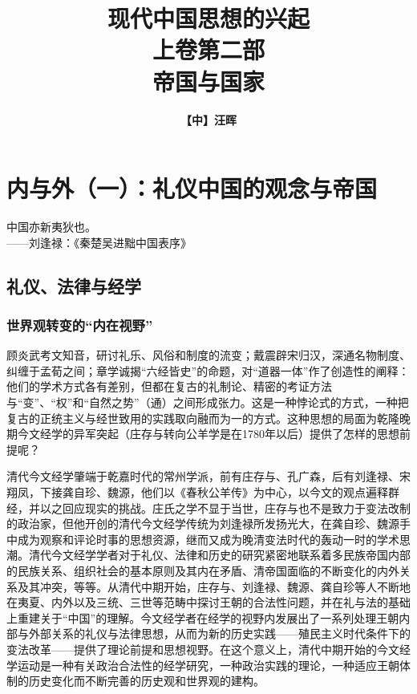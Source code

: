 \documentclass[a4paper, 12pt, openright]{ctexbook}
\renewenvironment{quote}
  {\list{}{\rightmargin2\ccwd \leftmargin2\ccwd \itemindent=2\ccwd \listparindent=2\ccwd}%
   \item\relax\small\kaishu\color{black}}
  {\endlist}
\begin{document}
\title{\Huge \textbf{现代中国思想的兴起}\\\Large 上卷\quad 第二部\\ \Large 帝国与国家}
\author{\textbf{【中】汪晖}}
\date{}

\frontmatter

\maketitle

\tableofcontents

\mainmatter

\setcounter{chapter}{4}

\chapter{内与外（一）：礼仪中国的观念与帝国}

\begin{quote}
中国亦新夷狄也。\\
\hspace*{0pt}\hfill ——刘逢禄：《秦楚吴进黜中国表序》
\end{quote}

\section{礼仪、法律与经学}

\subsection{世界观转变的“内在视野”}

顾炎武考文知音，研讨礼乐、风俗和制度的流变；戴震辟宋归汉，深通名物制度、纠缠于孟荀之间；章学诚揭“六经皆史”的命题，对“道器一体”作了创造性的阐释：他们的学术方式各有差别，但都在复古的礼制论、精密的考证方法与“变”、“权”和“自然之势”（通）之间形成张力。这是一种悖论式的方式，一种把复古的正统主义与经世致用的实践取向融而为一的方式。这种思想的局面为乾隆晚期今文经学的异军突起（庄存与转向公羊学是在1780年以后）提供了怎样的思想前提呢？

清代今文经学肇端于乾嘉时代的常州学派，前有庄存与、孔广森，后有刘逢禄、宋翔凤，下接龚自珍、魏源，他们以《春秋公羊传》为中心，以今文的观点遍释群经，并以之回应现实的挑战。庄氏之学不显于当世，庄存与也不是致力于变法改制的政治家，但他开创的清代今文经学传统为刘逢禄所发扬光大，在龚自珍、魏源手中成为观察和评论时事的思想资源，继而又成为晚清变法时代的轰动一时的学术思潮。清代今文经学学者对于礼仪、法律和历史的研究紧密地联系着多民族帝国内部的民族关系、组织社会的基本原则及其内在矛盾、清帝国面临的不断变化的内外关系及其冲突，等等。从清代中期开始，庄存与、刘逢禄、魏源、龚自珍等人不断地在夷夏、内外以及三统、三世等范畴中探讨王朝的合法性问题，并在礼与法的基础上重建关于“中国”的理解。今文经学者在经学的视野内发展出了一系列处理王朝内部与外部关系的礼仪与法律思想，从而为新的历史实践——殖民主义时代条件下的变法改革——提供了理论前提和思想视野。在这个意义上，清代中期开始的今文经学运动是一种有关政治合法性的经学研究，一种政治实践的理论，一种适应王朝体制的历史变化而不断完善的历史观和世界观的建构。
\end{document}
